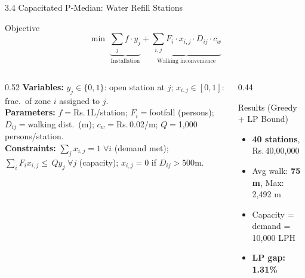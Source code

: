 \documentclass[aspectratio=169]{beamer}
\begin{document}
\begin{frame}{3.4 Capacitated P-Median: Water Refill Stations}
    \vspace{-0.15cm}
    \begin{alertblock}{Objective}
        \vspace{-0.2cm}
        $$ \min \; \underbrace{\sum_{j} f \cdot y_j}_{\text{Installation}} + \underbrace{\sum_{i,j} F_i \cdot x_{i,j} \cdot D_{ij} \cdot c_w}_{\text{Walking inconvenience}} $$
        \vspace{-0.2cm}
    \end{alertblock}
    \vspace{-0.1cm}
    \begin{columns}[T]
        \begin{column}{0.52\textwidth}
            \scriptsize
            \textbf{Variables:}
            $y_j \in \{0,1\}$: open station at $j$; \;
            $x_{i,j} \in [0,1]$: frac.\ of zone $i$ assigned to $j$.\\[0.05cm]
            \textbf{Parameters:}
            $f{=}$Rs.\,1L/station; \; $F_i{=}$footfall (persons); \; $D_{ij}{=}$walking dist.\ (m); \; $c_w{=}$Rs.\,0.02/m; \; $Q{=}$1{,}000 persons/station.\\[0.05cm]
            \textbf{Constraints:}
            $\sum_j x_{i,j}{=}1\;\forall i$ (demand met); \;
            $\sum_i F_i x_{i,j} {\le}\, Q y_j\;\forall j$ (capacity); \;
            $x_{i,j}{=}0$ if $D_{ij}{>}500$m.
        \end{column}
        \begin{column}{0.44\textwidth}
            \begin{exampleblock}{Results (Greedy + LP Bound)}
                \footnotesize
                \begin{itemize}\setlength\itemsep{0pt}
                    \item \textbf{40 stations}, Rs.\,40{,}00{,}000
                    \item Avg walk: \textbf{75 m}, Max: 2{,}492 m
                    \item Capacity = demand = 10{,}000 LPH
                    \item \textbf{LP gap: 1.31\%}
                \end{itemize}
            \end{exampleblock}
        \end{column}
    \end{columns}
\end{frame}
\end{document}
